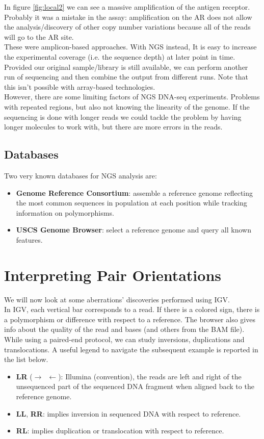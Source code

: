 In figure \ref{fig:local2} we can see a massive amplification of the antigen receptor. Probably it was a mistake in the assay: amplification on the AR does not allow the analysis/discovery of other copy number variations because all of the reads will go to the AR site. \\
These were amplicon-based approaches.
With NGS instead, It is easy to increase the experimental coverage (i.e. the sequence depth) at later point in time.
Provided our original sample/library is still available, we can perform another run of sequencing and then combine the output from different runs.
Note that this isn’t possible with array-based technologies.\\
However, there are some limiting factors of NGS DNA-seq experiments.
Problems with repeated regions, but also not knowing the linearity of the genome.
If the sequencing is done with longer reads we could tackle the problem by having longer molecules to work with, but there are more errors in the reads.

\subsection{Databases}
Two very known databases for NGS analysis are:
\begin{itemize}
\item \textbf{Genome Reference Consortium}: assemble a reference genome reflecting the most common sequences in population at each position while tracking information on polymorphisms.
\item \textbf{USCS Genome Browser}: select a reference genome and query all known features.
\end{itemize}

\section{Interpreting Pair Orientations}
We will now look at some aberrations' discoveries performed using IGV.\\
In IGV, each vertical bar corresponds to a read.
If there is a colored sign, there is a polymorphism or difference with respect to a reference.
The browser also gives info about the quality of the read and bases (and others from the BAM file).\\
While using a paired-end protocol, we can study inversions, duplications and translocations. A useful legend to navigate the subsequent example is reported in the list below.
\begin{itemize}
\item \textbf{LR} ($\rightarrow \, \, \, \leftarrow$): Illumina (convention), the reads are left and right of the unsequenced part of the sequenced DNA fragment when aligned back to the reference genome.
\item \textbf{LL}, \textbf{RR}: implies inversion in sequenced DNA with respect to reference.
\item \textbf{RL}: implies duplication or translocation with respect to reference.

\end{itemize}

